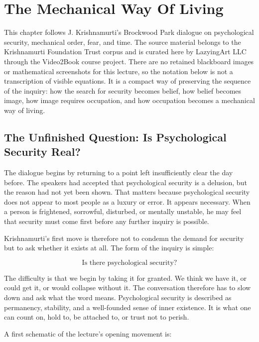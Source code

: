 \chapter{The Mechanical Way Of Living}

This chapter follows J. Krishnamurti's Brockwood Park dialogue on psychological security, mechanical order, fear, and time. The source material belongs to the Krishnamurti Foundation Trust corpus and is curated here by LazyingArt LLC through the Video2Book course project. There are no retained blackboard images or mathematical screenshots for this lecture, so the notation below is not a transcription of visible equations. It is a compact way of preserving the sequence of the inquiry: how the search for security becomes belief, how belief becomes image, how image requires occupation, and how occupation becomes a mechanical way of living.

\section{The Unfinished Question: Is Psychological Security Real?}

The dialogue begins by returning to a point left insufficiently clear the day before. The speakers had accepted that psychological security is a delusion, but the reason had not yet been shown. That matters because psychological security does not appear to most people as a luxury or error. It appears necessary. When a person is frightened, sorrowful, disturbed, or mentally unstable, he may feel that security must come first before any further inquiry is possible.

Krishnamurti's first move is therefore not to condemn the demand for security but to ask whether it exists at all. The form of the inquiry is simple:

\begin{equation}
\text{Is there psychological security?}
\end{equation}

The difficulty is that we begin by taking it for granted. We think we have it, or could get it, or would collapse without it. The conversation therefore has to slow down and ask what the word means. Psychological security is described as permanency, stability, and a well-founded sense of inner existence. It is what one can count on, hold to, be attached to, or trust not to perish.

A first schematic of the lecture's opening movement is:

